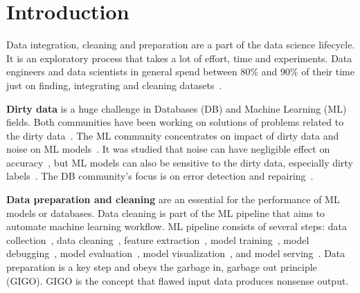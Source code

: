 \chapter{Introduction}
Data integration, cleaning and preparation are a part of the data science lifecycle. It is an exploratory process that takes a lot of effort, time and experiments.
Data engineers and data scientists in general spend between 80\% and 90\% of their time just on finding, integrating and cleaning datasets~\cite{80cleansurvey, dataintegration80}.

\textbf{Dirty data} is a huge challenge in Databases (DB) and Machine Learning (ML) fields.
Both communities have been working on solutions of problems related to the dirty data~\cite{cleanml}. 
The ML community concentrates on impact of dirty data and noise on ML models~\cite{cleanml}.
It was studied that noise can have negligible effect on accuracy~\cite{processingsys, outperformstudy}, but ML models can also be sensitive to the dirty data, especially dirty labels~\cite{classificationnoisesurvey}.
The DB community's focus is on error detection and repairing~\cite{Hellerstein08quantitativedata, duplicatesstudy}.

\textbf{Data preparation and cleaning} are an essential for the performance of ML models or databases.
Data cleaning is part of the ML pipeline that aims to automate machine learning workflow. 
ML pipeline consists of several steps: data collection~\cite{LiDLMS2015}, data cleaning~\cite{raha, baran, RekatsinasCIR2017, holodetect, activeclean, alphaclean, cleanml}, feature extraction~\cite{ShahLKYK2021}, model training~\cite{RekatsinasCIR2017}, model debugging~\cite{SagadeevaB2021}, model evaluation~\cite{generalizing_confusion_matrix}, model visualization~\cite{NakandalaKP2019, CrottyGZBK2015, SimonyanVZ2013}, and model serving~\cite{OlstonFGHLLRR2017, Lee2018, WeiGZWCNOSR2018}.
Data preparation is a key step and obeys the garbage in, garbage out principle (GIGO).
GIGO is the concept that flawed input data produces nonsense output.

